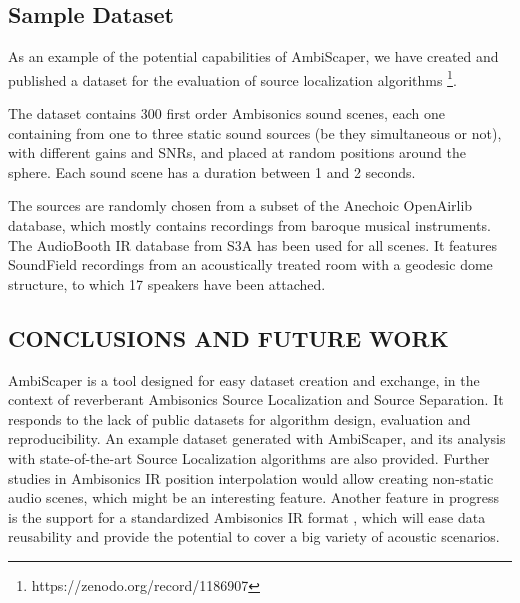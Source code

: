 \subsection{Sample Dataset}
\label{ssec:dataset}

As an example of the potential capabilities of AmbiScaper,  we have created and published a dataset for the evaluation of source localization algorithms \footnote{https://zenodo.org/record/1186907 }.

The dataset contains 300 first order Ambisonics sound scenes, each one containing from one to three static sound sources (be they simultaneous or not), with different gains and SNRs, and placed at random positions around the sphere. Each sound scene has a duration between 1 and 2 seconds.

The sources are randomly chosen from a subset of the Anechoic OpenAirlib database, which mostly contains recordings from baroque musical instruments.
The AudioBooth IR database from S3A has been used for all scenes.
It features SoundField recordings from an acoustically treated room with a geodesic dome structure, to which 17 speakers have been attached.



\subsection{CONCLUSIONS AND FUTURE WORK}
\label{sec:conclusions}

AmbiScaper is a tool designed for easy dataset creation and exchange, in the context of reverberant Ambisonics Source Localization and Source Separation. It responds to the lack of public datasets for algorithm design, evaluation and reproducibility. An example dataset generated with AmbiScaper, and its analysis with state-of-the-art Source Localization algorithms are also provided.
Further studies in Ambisonics IR position interpolation would allow creating non-static audio scenes, which might be an interesting feature. 
Another feature in progress is the support for a standardized Ambisonics IR format \cite{perez2018ambisonics}, which will ease data reusability and provide the potential to cover a big variety of acoustic scenarios. 







